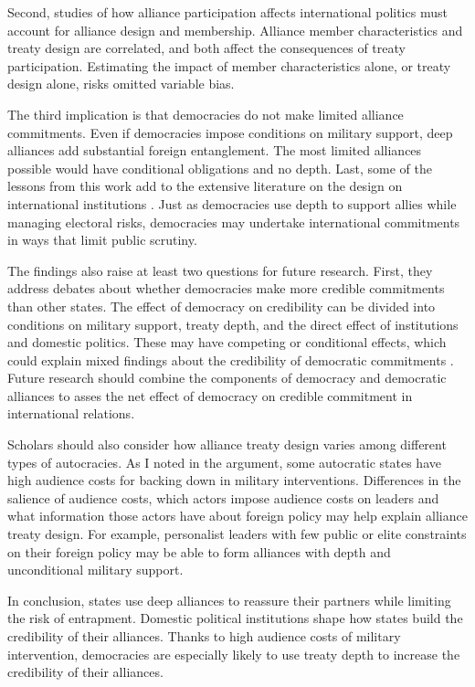 \documentclass[12pt]{article}
\begin{document}
Second, studies of how alliance participation affects international politics must account for alliance design and membership. 
Alliance member characteristics and treaty design are correlated, and both affect the consequences of treaty participation.   
Estimating the impact of member characteristics alone, or treaty design alone, risks omitted variable bias. 


The third implication is that democracies do not make limited alliance commitments. 
Even if democracies impose conditions on military support, deep alliances add substantial foreign entanglement.
The most limited alliances possible would have conditional obligations and no depth.  
Last, some of the lessons from this work add to the extensive literature on the design on international institutions \citep{DownesRocke1995, MartinSimmons1998, Koremenosetal2001, Koremenos2005, Thompson2010}.
Just as democracies use depth to support allies while managing electoral risks, democracies may undertake international commitments in ways that limit public scrutiny. 


The findings also raise at least two questions for future research.  
First, they address debates about whether democracies make more credible commitments than other states. 
The effect of democracy on credibility can be divided into conditions on military support, treaty depth, and the direct effect of institutions and domestic politics. 
These may have competing or conditional effects, which could explain mixed findings about the credibility of democratic commitments \citep{Schultz1999, Leeds1999, Thyne2012, DownesSechser2012}.
Future research should combine the components of democracy and democratic alliances to asses the net effect of democracy on credible commitment in international relations. 


Scholars should also consider how alliance treaty design varies among different types of autocracies. 
As I noted in the argument, some autocratic states have high audience costs for backing down in military interventions. 
Differences in the salience of audience costs, which actors impose audience costs on leaders and what information those actors have about foreign policy \citep{Weeks2008} may help explain alliance treaty design.
For example, personalist leaders with few public or elite constraints on their foreign policy may be able to form alliances with depth and unconditional military support. 


In conclusion, states use deep alliances to reassure their partners while limiting the risk of entrapment. 
Domestic political institutions shape how states build the credibility of their alliances.
Thanks to high audience costs of military intervention, democracies are especially likely to use treaty depth to increase the credibility of their alliances. 



\singlespace
 
 
\end{document}
